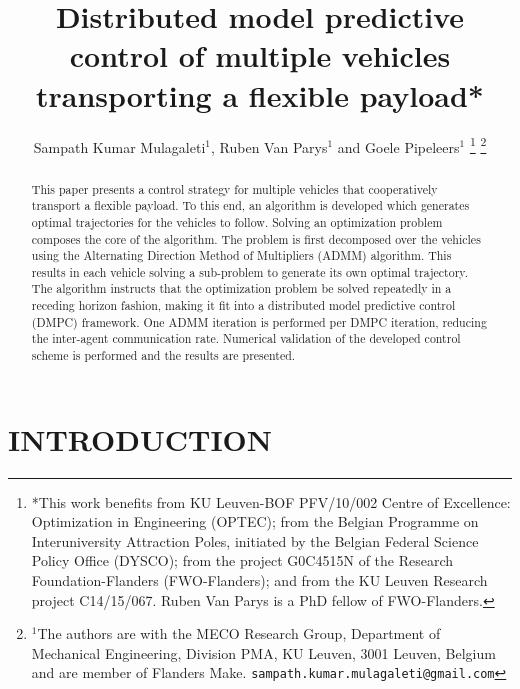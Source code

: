 \documentclass[letterpaper, 10 pt, conference]{ieeeconf}
\title{\LARGE \bf
Distributed model predictive control of multiple
vehicles transporting a flexible payload*
}
\author{Sampath Kumar Mulagaleti$^{1}$, Ruben Van Parys$^{1}$ and Goele Pipeleers$^{1}$%
\thanks{*This work benefits from KU Leuven-BOF PFV/10/002 Centre of Excellence: Optimization in Engineering (OPTEC); from the Belgian Programme on Interuniversity Attraction Poles, initiated by the Belgian Federal Science Policy Office (DYSCO); from the project G0C4515N of the Research Foundation-Flanders (FWO-Flanders); and from the KU Leuven Research project C14/15/067. Ruben Van Parys is a PhD fellow of FWO-Flanders. }%
\thanks{$^{1}$The authors are with the MECO Research Group, Department of Mechanical Engineering, Division PMA, KU Leuven, 3001 Leuven, Belgium and are member of Flanders Make. \texttt{sampath.kumar.mulagaleti@gmail.com}}
}
\begin{document}
\maketitle
\thispagestyle{empty}
\pagestyle{empty}


\begin{abstract}
This paper presents a control strategy for multiple vehicles that cooperatively transport a flexible payload. To this end, an algorithm is developed which generates optimal trajectories for the vehicles to follow. Solving an optimization problem composes the core of the algorithm. The problem is first decomposed over the vehicles using the Alternating Direction Method of Multipliers (ADMM) algorithm. This results in each vehicle solving a sub-problem to generate its own optimal trajectory. The algorithm instructs that the optimization problem be solved repeatedly in a receding horizon fashion, making it fit into a distributed model predictive control (DMPC) framework. One ADMM iteration is performed per DMPC iteration, reducing the inter-agent communication rate. Numerical validation of the developed control scheme is performed and the results are presented.
\end{abstract}


\section{INTRODUCTION}
\end{document}
